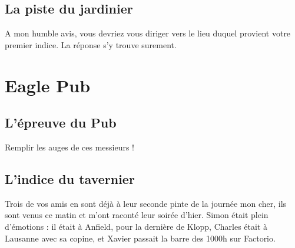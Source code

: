 \documentclass[12pt]{article}
\begin{document}
\subsection{La piste du jardinier}

A mon humble avis, vous devriez vous diriger vers le lieu duquel provient votre premier indice. La réponse s'y trouve surement. 

\section{Eagle Pub}

\subsection{L'épreuve du Pub}

Remplir les auges de ces messieurs !

\subsection{L'indice du tavernier}

Trois de vos amis en sont déjà à leur seconde pinte de la journée mon cher, ils sont venus ce matin et m'ont raconté leur soirée d'hier. Simon était plein d'émotions : il était à Anfield, pour la dernière de Klopp, Charles était à Lausanne avec sa copine, et Xavier passait la barre des 1000h sur Factorio. 
\end{document}
